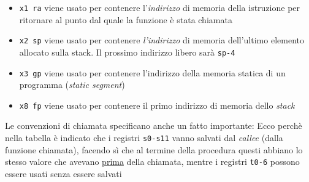 \begin{itemize}
	\item \verb|x1 ra| viene usato per contenere l'\textit{indirizzo} di memoria della istruzione per ritornare al punto dal quale la funzione è stata chiamata
	\item \verb|x2 sp| viene usato per contenere \textit{l'indirizzo} di memoria dell'ultimo elemento allocato sulla stack. Il prossimo indirizzo libero sarà \verb|sp-4|
	\item \verb|x3 gp| viene usato per contenere l'indirizzo della memoria statica di un programma (\textit{static segment})
	\item \verb |x8 fp| viene usato per contenere il primo indirizzo di memoria dello \textit{stack}
\end{itemize}
Le convenzioni di chiamata specificano anche un fatto importante:
Ecco perchè nella tabella è indicato che i registri \verb|s0-s11| vanno salvati dal \textit{callee} (dalla funzione chiamata), facendo sì che al termine della procedura questi abbiano lo stesso valore che avevano \underline{prima} della chiamata, mentre i registri \verb|t0-6| possono essere usati senza essere salvati
